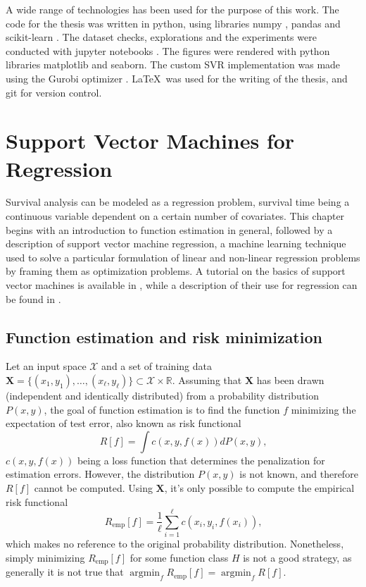 \documentclass[12pt]{report}
\begin{document}
A wide range of technologies has been used for the purpose of this work. The code for the thesis was written in python, using libraries numpy \cite{numpy}, pandas \cite{pandas} and scikit-learn \cite{sklearn}. The dataset checks, explorations and the experiments were conducted with jupyter notebooks \cite{jupyter}. The figures were rendered with python libraries matplotlib \cite{matplotlib} and seaborn. The custom SVR implementation was made using the Gurobi optimizer \cite{gurobi}. \LaTeX\ was used for the writing of the thesis, and git for version control.

\chapter{Support Vector Machines for Regression}
\label{chsvm}
Survival analysis can be modeled as a regression problem, survival time being a continuous variable dependent on a certain number of covariates. This chapter begins with an introduction to function estimation in general, followed by a description of support vector machine regression, a machine learning technique used to solve a particular formulation of linear and non-linear regression problems by framing them as optimization problems. A tutorial on the basics of support vector machines is available in \cite{svmtutorial}, while a description of their use for regression can be found in \cite{svregtutorial}.

\section{Function estimation and risk minimization}
Let an input space $ \mathcal{X} $ and a set of training data $ \mathbf{X} = \lbrace (x_{1},y_{1}),\ldots,(x_{\ell},y_{\ell})\rbrace \subset \mathcal{X} \times \mathbb{R} $. Assuming that $\mathbf{X}$ has been drawn (independent and identically distributed) from a probability distribution $ P(x,y) $, the goal of function estimation is to find the function $ f $ minimizing the expectation of test error, also known as risk functional \cite{vapnik82}
\begin{equation} \label{riskfun}
R[f] = \int c(x,y,f(x))dP(x,y) \text{,}
\end{equation}
$ c(x,y,f(x)) $ being a loss function that determines the penalization for estimation errors. However, the distribution $ P(x,y) $ is not known, and therefore $ R[f] $ cannot be computed. Using $ \mathbf{X} $, it's only possible to compute the empirical risk functional
\begin{equation} \label{empriskfun}
R_{\text{emp}}[f] = \dfrac{1}{\ell} \sum_{i=1}^{\ell}c(x_{i},y_{i},f(x_{i})) \text{,}
\end{equation}
which makes no reference to the original probability distribution. Nonetheless, simply minimizing $ R_{\text{emp}}[f] $ for some function class $ H $ is not a good strategy, as generally it is not true that $ \operatorname*{argmin}_{f} R_{\text{emp}}[f] = \operatorname*{argmin}_{f} R[f] $.
\end{document}
